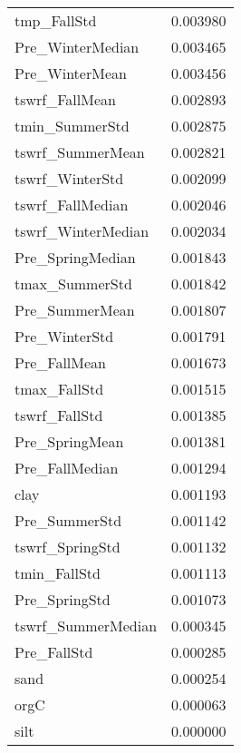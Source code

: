 \begin{tabular}{lr}
tmp_FallStd & 0.003980 \\
Pre_WinterMedian & 0.003465 \\
Pre_WinterMean & 0.003456 \\
tswrf_FallMean & 0.002893 \\
tmin_SummerStd & 0.002875 \\
tswrf_SummerMean & 0.002821 \\
tswrf_WinterStd & 0.002099 \\
tswrf_FallMedian & 0.002046 \\
tswrf_WinterMedian & 0.002034 \\
Pre_SpringMedian & 0.001843 \\
tmax_SummerStd & 0.001842 \\
Pre_SummerMean & 0.001807 \\
Pre_WinterStd & 0.001791 \\
Pre_FallMean & 0.001673 \\
tmax_FallStd & 0.001515 \\
tswrf_FallStd & 0.001385 \\
Pre_SpringMean & 0.001381 \\
Pre_FallMedian & 0.001294 \\
clay & 0.001193 \\
Pre_SummerStd & 0.001142 \\
tswrf_SpringStd & 0.001132 \\
tmin_FallStd & 0.001113 \\
Pre_SpringStd & 0.001073 \\
tswrf_SummerMedian & 0.000345 \\
Pre_FallStd & 0.000285 \\
sand & 0.000254 \\
orgC & 0.000063 \\
silt & 0.000000 \\
\bottomrule
\end{tabular}
